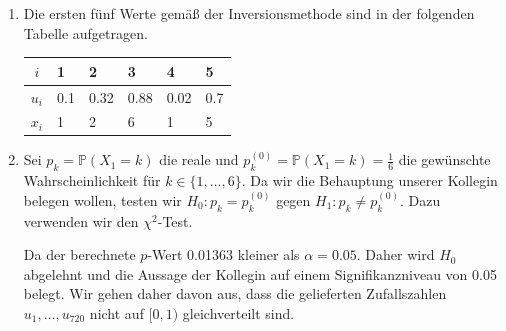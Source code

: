 \documentclass[a4paper]{scrartcl}
\newcommand{\prob}{\mathbb{P}}
\def \blattnr {12}
\begin{document}
\begin{enumerate}[label=\bfseries \blattnr.\arabic*]
\begin{enumerate}
            \item
                Die ersten fünf Werte gemäß der Inversionsmethode sind in der
                folgenden Tabelle aufgetragen.
                \begin{table}[H]
                    \centering
                    \begin{tabular}{c|l|l|l|l|l}
                        $i$   & 1 & 2 & 3 & 4 & 5 \\ \hline
                        $u_i$ & \num{0.1} & \num{0.32} & \num{0.88} & \num{0.02} & \num{0.7} \\ \hline
                        $x_i$ & 1 & 2 & 6 & 1 & 5 \\
                    \end{tabular}
                \end{table}

            \item
                Sei $p_k = \prob(X_1 = k)$ die reale und $p_k^{(0)} = \prob(X_1
                = k) = \frac{1}{6}$ die gewünschte Wahrscheinlichkeit für $k
                \in \{1, \dotsc, 6\}$.
                Da wir die Behauptung unserer Kollegin belegen wollen, testen
                wir $H_0\colon p_k = p_k^{(0)}$ gegen $H_1\colon p_k \neq
                p_k^{(0)}$.
                Dazu verwenden wir den $\chi^2$-Test.
                
                
                Da der berechnete $p$-Wert \num{0.01363} kleiner als $\alpha =
                \num{0,05}$. Daher wird $H_0$ abgelehnt und die Aussage der
                Kollegin auf einem Signifikanzniveau von \num{0,05} belegt.
                Wir gehen daher davon aus, dass die gelieferten Zufallszahlen
                $u_1, \dotsc, u_{720}$ nicht auf $[0,1)$ gleichverteilt sind.

        \end{enumerate}


\end{enumerate}
\end{document}

